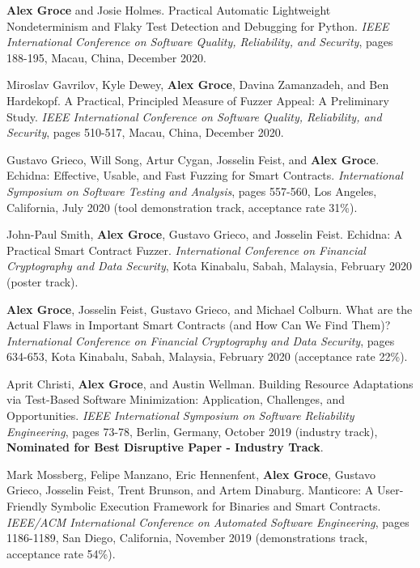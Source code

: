 \documentclass[ComputerScience]{vita}
\begin{document}
\begin{vita}
\begin{Refereed Conference and Workshop Publications}
\item {\bf Alex Groce} and Josie Holmes.
\newblock Practical Automatic Lightweight Nondeterminism and
           Flaky Test Detection and Debugging for Python.
\newblock \emph{IEEE International Conference on Software
Quality, Reliability, and Security}, pages 188-195, Macau,
China, December 2020.
  
\item Miroslav Gavrilov, Kyle Dewey, {\bf Alex Groce}, Davina Zamanzadeh,
  and Ben Hardekopf.
\newblock A Practical, Principled Measure of Fuzzer Appeal: A
Preliminary Study.
\newblock \emph{IEEE International Conference on Software
Quality, Reliability, and Security}, pages 510-517, Macau,
China, December 2020.
  
\item Gustavo Grieco, Will Song, Artur Cygan, Josselin Feist, and {\bf
    Alex Groce}.
\newblock Echidna: Effective, Usable, and Fast Fuzzing for Smart Contracts.
\newblock \emph{International Symposium on Software Testing and
  Analysis}, pages 557-560, Los Angeles, California, July
2020 (tool demonstration track, acceptance rate 31\%).
  
\item John-Paul Smith, {\bf Alex Groce}, Gustavo Grieco, and Josselin Feist.
\newblock Echidna: A Practical Smart Contract Fuzzer.
\newblock \emph{International Conference on Financial Cryptography and
  Data Security}, Kota Kinabalu, Sabah,
Malaysia, February 2020 (poster track).
  
\item {\bf Alex Groce}, Josselin Feist, Gustavo Grieco, and Michael Colburn. 
\newblock What are the Actual
Flaws in Important Smart Contracts (and How Can We Find Them)?
\newblock \emph{International Conference on Financial Cryptography and
  Data Security}, pages 634-653, Kota Kinabalu, Sabah, Malaysia, February 2020
(acceptance rate 22\%).

\item Aprit Christi, {\bf Alex Groce}, and Austin Wellman.
\newblock Building Resource Adaptations via Test-Based Software
Minimization: Application, Challenges, and Opportunities.
\newblock \emph{IEEE International Symposium on Software Reliability 
  Engineering}, pages 73-78, Berlin, Germany, October
2019 (industry track), {\bf Nominated for Best Disruptive Paper - Industry Track}.
  
\item Mark Mossberg, Felipe Manzano, Eric Hennenfent, {\bf Alex
    Groce}, Gustavo Grieco, Josselin Feist, Trent Brunson, and Artem Dinaburg.
\newblock Manticore: A User-Friendly Symbolic Execution Framework for Binaries and Smart Contracts.
\newblock \emph{IEEE/ACM International Conference on Automated Software
  Engineering}, pages 1186-1189, San Diego, California,
November 2019 (demonstrations track, acceptance rate 54\%).
  

\end{Refereed Conference and Workshop Publications}
\end{vita}
\end{document}
